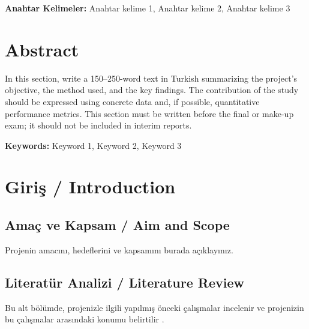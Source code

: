 \documentclass[11pt,a4paper]{article}
\begin{document}
\vspace{6pt}
\noindent\textbf{Anahtar Kelimeler:} Anahtar kelime 1, Anahtar kelime 2, Anahtar kelime 3

\vspace{1cm}

\section*{Abstract}
In this section, write a 150–250-word text in Turkish summarizing the project’s objective, the method used, and the key findings. The contribution of the study should be expressed using concrete data and, if possible, quantitative performance metrics. This section must be written before the final or make-up exam; it should not be included in interim reports.

\vspace{6pt}
\noindent\textbf{Keywords:} Keyword 1, Keyword 2, Keyword 3

\newpage
\tableofcontents
\newpage
\listoffigures
\listoftables
\newpage

\setcounter{page}{1}

\section{Giriş / Introduction}
\label{sec:giris}

\subsection{Amaç ve Kapsam / Aim and Scope}
\label{subsec:amac_kapsam}
Projenin amacını, hedeflerini ve kapsamını burada açıklayınız.

\subsection{Literatür Analizi / Literature Review}
\label{subsec:literatur}
Bu alt bölümde, projenizle ilgili yapılmış önceki çalışmalar incelenir ve projenizin bu çalışmalar arasındaki konumu belirtilir \cite{ornek2023}.

\newpage
\end{document}

